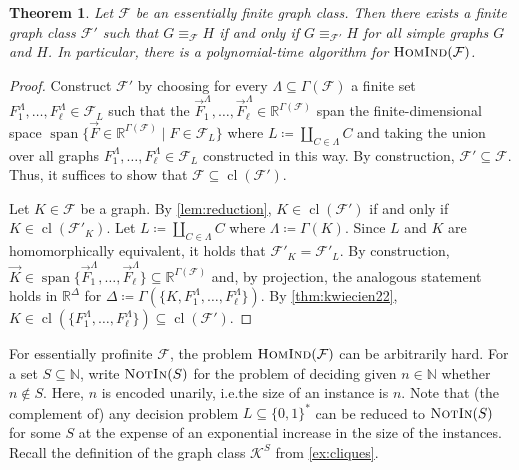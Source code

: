 \documentclass[3p,final]{elsarticle}
\DeclareMathOperator{\spn}{span}
\newcommand{\HomInd}{\textup{\textsc{HomInd}}}
\newcommand{\Mem}{\textup{\textsc{NotIn}}}
\DeclareMathOperator{\cl}{cl}
\newtheorem{theorem}{Theorem}
\begin{document}
	\begin{theorem} \label{thm:finite}
		Let $\mathcal{F}$ be an essentially finite graph class. 
		Then there exists a finite graph class $\mathcal{F}'$ such that $G \equiv_{\mathcal{F}} H$ if and only if $G \equiv_{\mathcal{F}'} H$ for all simple graphs $G$ and $H$.
		In particular, there is a polynomial-time algorithm for $\HomInd(\mathcal{F})$.
	\end{theorem}
	\begin{proof}%
		Construct $\mathcal{F}'$ by choosing for every $\Lambda \subseteq \Gamma(\mathcal{F})$ a
		finite set $F_1^\Lambda, \dots, F_\ell^\Lambda \in \mathcal{F}_L$ such that the 
		$\vec{F}_1^\Lambda, \dots, \vec{F}_\ell^\Lambda \in \mathbb{R}^{\Gamma(\mathcal{F})}$ span the finite-dimensional space $\spn\{\vec{F} \in \mathbb{R}^{\Gamma(\mathcal{F})} \mid F \in \mathcal{F}_L\}$
		where $L \coloneqq \coprod_{C \in \Lambda} C$ and taking the union over all graphs $F_1^\Lambda, \dots, F_\ell^\Lambda \in \mathcal{F}_L$ constructed in this way. By construction, $\mathcal{F}' \subseteq \mathcal{F}$. Thus, it suffices to show that $\mathcal{F} \subseteq \cl(\mathcal{F}')$.
		
		Let $K \in \mathcal{F}$ be a graph. 
		By \cref{lem:reduction}, $K \in \cl(\mathcal{F}')$ if and only if $K \in \cl(\mathcal{F}'_K)$.
		Let $L \coloneqq \coprod_{C \in \Lambda} C$ where $\Lambda \coloneqq \Gamma(K)$. Since $L$ and $K$ are homomorphically equivalent, it holds that $\mathcal{F}'_K = \mathcal{F}'_L$.
		By construction, $\vec{K} \in \spn \{\vec{F}_1^\Lambda, \dots, \vec{F}_\ell^\Lambda\} \subseteq \mathbb{R}^{\Gamma(\mathcal{F})}$ and, by projection, the analogous statement holds in $\mathbb{R}^{\Delta}$ for $\Delta \coloneqq \Gamma(\{K, F_1^\Lambda, \dots, F_\ell^\Lambda\})$.
		By \cref{thm:kwiecien22}, $K \in \cl(\{F_1^{\Lambda}, \dots, F_\ell^{\Lambda}\}) \subseteq \cl(\mathcal{F}')$.
	\end{proof}
	For essentially profinite $\mathcal{F}$, the problem $\HomInd(\mathcal{F})$ can be arbitrarily hard.
	For a set $S \subseteq \mathbb{N}$, write $\Mem(S)$ for the problem of deciding given $n \in \mathbb{N}$ whether $n \not\in S$.
	Here, $n$ is encoded unarily, i.e.\@ the size of an instance is $n$. 
	Note that (the complement of) any decision problem $L \subseteq \{0,1\}^*$ can be reduced to $\Mem(S)$ for some $S$ at the expense of an exponential increase in the size of the instances.
	Recall the definition of the graph class $\mathcal{K}^S$ from \cref{ex:cliques}.
	
\end{document}
